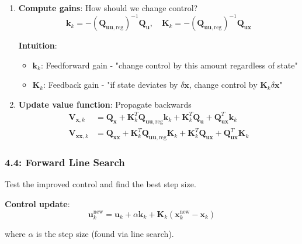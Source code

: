 \documentclass[11pt,a4paper]{article}
\begin{document}
\begin{enumerate}
    \item \textbf{Compute gains}: How should we change control?
    \begin{equation}
    \mathbf{k}_k = -(\mathbf{Q}_{\mathbf{uu},\text{reg}})^{-1} \mathbf{Q}_{\mathbf{u}}, \quad \mathbf{K}_k = -(\mathbf{Q}_{\mathbf{uu},\text{reg}})^{-1} \mathbf{Q}_{\mathbf{ux}}
    \end{equation}
    
    \textbf{Intuition}:
    \begin{itemize}
        \item $\mathbf{k}_k$: Feedforward gain - "change control by this amount regardless of state"
        \item $\mathbf{K}_k$: Feedback gain - "if state deviates by $\delta \mathbf{x}$, change control by $\mathbf{K}_k \delta \mathbf{x}$"
    \end{itemize}
    
    \item \textbf{Update value function}: Propagate backwards
    \begin{align}
    \mathbf{V}_{\mathbf{x},k} &= \mathbf{Q}_{\mathbf{x}} + \mathbf{K}_k^T \mathbf{Q}_{\mathbf{uu},\text{reg}} \mathbf{k}_k + \mathbf{K}_k^T \mathbf{Q}_{\mathbf{u}} + \mathbf{Q}_{\mathbf{ux}}^T \mathbf{k}_k \\
    \mathbf{V}_{\mathbf{xx},k} &= \mathbf{Q}_{\mathbf{xx}} + \mathbf{K}_k^T \mathbf{Q}_{\mathbf{uu},\text{reg}} \mathbf{K}_k + \mathbf{K}_k^T \mathbf{Q}_{\mathbf{ux}} + \mathbf{Q}_{\mathbf{ux}}^T \mathbf{K}_k
    \end{align}
\end{enumerate}

\subsubsection{4.4: Forward Line Search}

Test the improved control and find the best step size.

\textbf{Control update}:
\begin{equation}
\mathbf{u}_k^{\text{new}} = \mathbf{u}_k + \alpha \mathbf{k}_k + \mathbf{K}_k (\mathbf{x}_k^{\text{new}} - \mathbf{x}_k)
\end{equation}

where $\alpha$ is the step size (found via line search).
\end{document}

